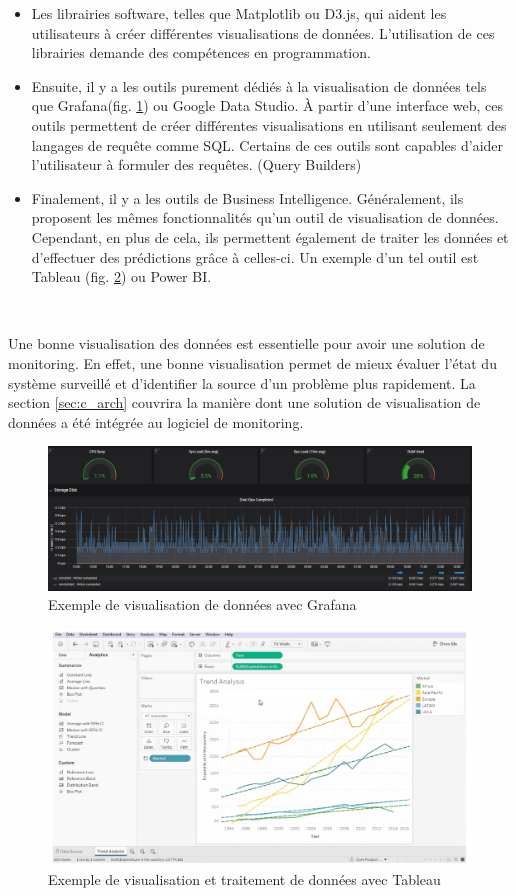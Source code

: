 \begin{itemize}
  \item Les librairies software, telles que Matplotlib ou D3.js, qui aident les utilisateurs à créer différentes visualisations de données. L'utilisation de ces librairies demande des compétences en programmation.

  \item Ensuite, il y a les outils purement dédiés à la visualisation de données tels que Grafana(fig. \ref{fig:graf_ex}) ou Google Data Studio. À partir d'une interface web, ces outils permettent de créer différentes visualisations en utilisant seulement des langages de requête comme SQL. Certains de ces outils sont capables d'aider l'utilisateur à formuler des requêtes. (Query Builders)

  \item Finalement, il y a les outils de Business Intelligence. Généralement, ils proposent les mêmes fonctionnalités qu'un outil de visualisation de données. Cependant, en plus de cela, ils permettent également de traiter les données et d'effectuer des prédictions grâce à celles-ci. Un exemple d'un tel outil est Tableau (fig. \ref{fig:tab_ex}) ou Power BI.
\end{itemize}

~

\noindent
Une bonne visualisation des données est essentielle pour avoir une solution de monitoring. En effet, une bonne visualisation permet de mieux évaluer l’état du système surveillé et d’identifier la source d’un problème plus rapidement. La section \ref{sec:c_arch} couvrira la manière dont une solution de visualisation de données a été intégrée au logiciel de monitoring.


\begin{figure}[ht!]
  \includegraphics[width=\textwidth]{img/state_of_the_art/data_grafana.png}
  \caption{Exemple de visualisation de données avec Grafana}
  \label{fig:graf_ex}
\end{figure}


\begin{figure}[ht!]
  \includegraphics[width=\textwidth]{img/state_of_the_art/tableau.png}
  \caption{Exemple de visualisation et traitement de données avec Tableau \cite{tableau_ex}}
  \label{fig:tab_ex}
\end{figure}
